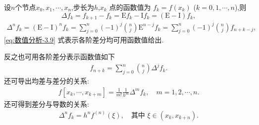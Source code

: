 \documentclass[../../main.tex]{subfiles}
\begin{document}
\begin{theorem}\label{theorem:差分的基本性质}
设$n$个节点$x_0,x_1,\cdots,x_n$,步长为$h$,$x_k$ 点的函数值为 $f_k = f(x_k)$ ($k = 0, 1, \cdots, n$),则
\[
\Delta f_k = f_{k+1} - f_k = \mathrm{E}f_k - \mathrm{I}f_k = (\mathrm{E} - \mathrm{I})f_k,
\]
\begin{align}
\Delta^n f_k = (\mathrm{E} - \mathrm{I})^n f_k = \sum_{j=0}^n (-1)^j \binom{n}{j} \mathrm{E}^{n-j} f_k = \sum_{j=0}^n (-1)^j \binom{n}{j} f_{n+k-j}, \label{eq:数值分析-3.9}
\end{align}
\eqref{eq:数值分析-3.9} 式表示各阶差分均可用函数值给出.

反之也可用各阶差分表示函数值如下
\begin{align}
f_{n+k} = \sum_{j=0}^n \binom{n}{j} \Delta^j f_k. \label{eq:数值分析-3.10}
\end{align}
还可导出均差与差分的关系:
\begin{align}
f[x_k, \cdots, x_{k+m}] = \frac{1}{m!} \frac{1}{h^m} \Delta^m f_k, \quad m = 1, 2, \cdots, n. \label{eq:数值分析-3.11}
\end{align}
还可得到差分与导数的关系:
\begin{align}
\Delta^n f_k = h^n f^{(n)}(\xi), \quad \text{其中 } \xi \in (x_k, x_{k+n}). \label{eq:数值分析-3.12}
\end{align}
\end{theorem}
\end{document}
